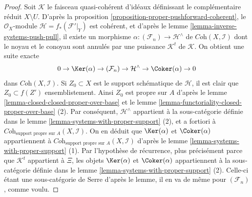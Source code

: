 \begin{proof}
\medskip\noindent
Soit $\mathcal{K}$ le faisceau quasi-cohérent d'idéaux définissant
le complémentaire réduit $X \setminus U$. D'après la
proposition \ref{proposition-proper-pushforward-coherent},
le $\mathcal{O}_X$-module $\mathcal{H} = f_*(\mathcal{F}'|_Y)$ est cohérent,
et d'après le lemme \ref{lemma-inverse-systems-push-pull},
il existe un morphisme $\alpha : (\mathcal{F}_n) \to \mathcal{H}^\wedge$
de $\textit{Coh}(X, \mathcal{I})$ dont le noyau et le conoyau
sont annulés par une puissance $\mathcal{K}^t$ de $\mathcal{K}$.
On obtient une suite exacte
$$
0 \to \Ker(\alpha) \to (\mathcal{F}_n) \to
\mathcal{H}^\wedge \to \Coker(\alpha) \to 0
$$
dans $\textit{Coh}(X, \mathcal{I})$. Si $Z_0 \subset X$ est le support
schématique de $\mathcal{H}$, il est clair que $Z_0 \subset f(Z')$
ensemblistement. Ainsi $Z_0$ est propre sur $A$ d'après le
lemme \ref{lemma-closed-closed-proper-over-base} et le
lemme \ref{lemma-functoriality-closed-proper-over-base} (2). Par
conséquent, $\mathcal{H}^\wedge$ appartient à la sous-catégorie définie dans le
lemme \ref{lemma-systems-with-proper-support} (2), et
a fortiori à
$\textit{Coh}_{\text{support propre sur }A}(X, \mathcal{I})$.
On en déduit que $\Ker(\alpha)$ et $\Coker(\alpha)$
appartiennent à $\textit{Coh}_{\text{support propre sur }A}(X, \mathcal{I})$
d'après le lemme \ref{lemma-systems-with-proper-support} (1). Par
l'hypothèse de récurrence, plus précisément parce que $\mathcal{K}^t$ appartient à $\Xi$,
les objets $\Ker(\alpha)$ et $\Coker(\alpha)$ appartiennent à
la sous-catégorie définie dans le
lemme \ref{lemma-systems-with-proper-support} (2). Celle-ci
étant une sous-catégorie de Serre d'après le lemme, il en va
de même pour $(\mathcal{F}_n)$, comme voulu.
\end{proof}

